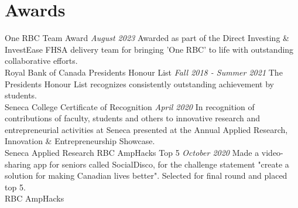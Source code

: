 \documentclass[letterpaper]{moderncv}
\begin{document}
\section{Awards}
\cventry
{}
{One RBC Team Award}
{}
{\textit{August 2023}}
{}
{Awarded as part of the Direct Investing \& InvestEase FHSA delivery team for bringing 'One RBC' to life with outstanding collaborative efforts.\\Royal Bank of Canada}
\vspace{1mm}
\cventry
{}
{President\textquotesingle{}s Honour List}
{}
{\textit{Fall 2018 - Summer 2021}}
{}
{The President\textquotesingle{}s Honour List recognizes consistently outstanding achievement by students.\\Seneca College}
\vspace{1mm}
\cventry
{}
{Certificate of Recognition}
{}
{\textit{April 2020}}
{}
{In recognition of contributions of faculty, students and others to innovative research and entrepreneurial activities at Seneca presented at the Annual Applied Research, Innovation \& Entrepreneurship Showcase.\\Seneca Applied Research}
\vspace{1mm}
\cventry
{}
{RBC AmpHacks Top 5}
{}
{\textit{October 2020}}
{}
{Made a video-sharing app for seniors called SocialDisco, for the challenge statement "create a solution for making Canadian lives better". Selected for final round and placed top 5.\\RBC AmpHacks}
\vspace{1mm}
\ 
\end{document}

